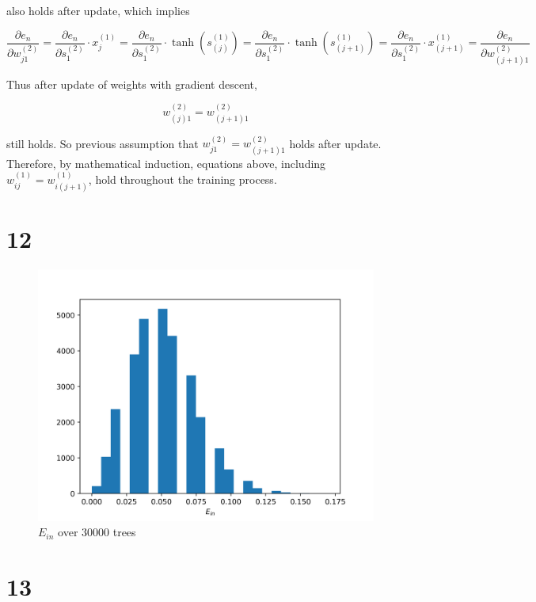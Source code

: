 \documentclass[fleqn,a4paper,12pt]{article}
\begin{document}
also holds after update, which implies

\begin{equation*}
  \frac{\partial e_n}{\partial w_{j1}^{(2)}}
  = \frac{\partial e_n}{\partial s_1^{(2)}} \cdot x_j^{(1)}
  = \frac{\partial e_n}{\partial s_1^{(2)}} \cdot \tanh(s^{(1)}_{(j)})
  = \frac{\partial e_n}{\partial s_1^{(2)}} \cdot \tanh(s^{(1)}_{(j+1)})
  = \frac{\partial e_n}{\partial s_1^{(2)}} \cdot x_{(j+1)}^{(1)}
  = \frac{\partial e_n}{\partial w_{(j + 1)1}^{(2)}}
\end{equation*}

Thus after update of weights with gradient descent,

\begin{equation*}
  w_{(j)1}^{(2)} = w_{(j + 1)1}^{(2)}
\end{equation*}

still holds. So previous assumption that $w_{j1}^{(2)} = w_{(j + 1)1}^{(2)}$ holds after update. Therefore, by mathematical induction, equations above, including $w_{ij}^{(1)} = w_{i(j + 1)}^{(1)}$, hold throughout the training process.

\section*{12}

\begin{figure}[H]
\centering
\includegraphics[width=0.75\linewidth]{hist-ein.png}
\caption{$E_{in}$ over 30000 trees}
\label{fig:hist-ein}
\end{figure}

\section*{13}
\end{document}
